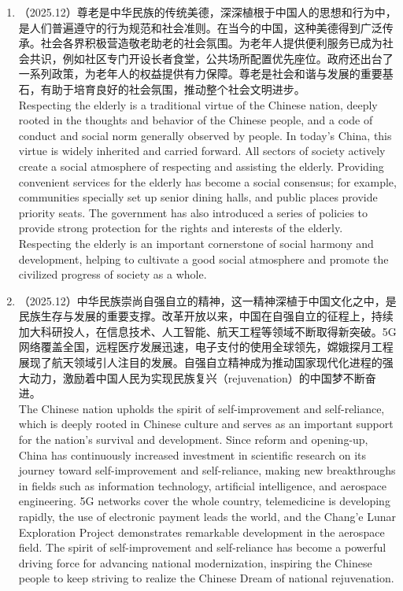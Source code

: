 ﻿\documentclass[lang=cn,11pt]{elegantbook}
\begin{document}
\begin{enumerate}
    \item （2025.12）尊老是中华民族的传统美德，深深植根于中国人的思想和行为中，是人们普遍遵守的行为规范和社会准则。在当今的中国，这种美德得到广泛传承。社会各界积极营造敬老助老的社会氛围。为老年人提供便利服务已成为社会共识，例如社区专门开设长者食堂，公共场所配置优先座位。政府还出台了一系列政策，为老年人的权益提供有力保障。尊老是社会和谐与发展的重要基石，有助于培育良好的社会氛围，推动整个社会文明进步。\\Respecting the elderly is a traditional virtue of the Chinese nation, deeply rooted in the thoughts and behavior of the Chinese people, and a code of conduct and social norm generally observed by people. In today’s China, this virtue is widely inherited and carried forward. All sectors of society actively create a social atmosphere of respecting and assisting the elderly. Providing convenient services for the elderly has become a social consensus; for example, communities specially set up senior dining halls, and public places provide priority seats. The government has also introduced a series of policies to provide strong protection for the rights and interests of the elderly. Respecting the elderly is an important cornerstone of social harmony and development, helping to cultivate a good social atmosphere and promote the civilized progress of society as a whole.
    \item （2025.12）中华民族崇尚自强自立的精神，这一精神深植于中国文化之中，是民族生存与发展的重要支撑。改革开放以来，中国在自强自立的征程上，持续加大科研投人，在信息技术、人工智能、航天工程等领域不断取得新突破。5G网络覆盖全国，远程医疗发展迅速，电子支付的使用全球领先，嫦娥探月工程展现了航天领域引人注目的发展。自强自立精神成为推动国家现代化进程的强大动力，激励着中国人民为实现民族复兴（rejuvenation）的中国梦不断奋进。\\The Chinese nation upholds the spirit of self-improvement and self-reliance, which is deeply rooted in Chinese culture and serves as an important support for the nation’s survival and development. Since reform and opening-up, China has continuously increased investment in scientific research on its journey toward self-improvement and self-reliance, making new breakthroughs in fields such as information technology, artificial intelligence, and aerospace engineering. 5G networks cover the whole country, telemedicine is developing rapidly, the use of electronic payment leads the world, and the Chang’e Lunar Exploration Project demonstrates remarkable development in the aerospace field. The spirit of self-improvement and self-reliance has become a powerful driving force for advancing national modernization, inspiring the Chinese people to keep striving to realize the Chinese Dream of national rejuvenation.

\end{enumerate}
\end{document}
